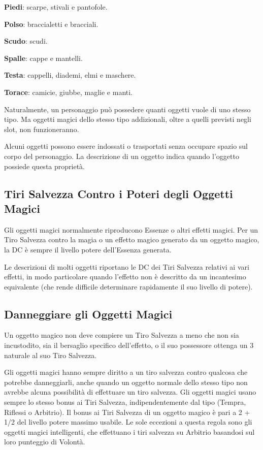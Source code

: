 \documentclass[a4paper,11pt,twoside,openany]{book}
\begin{document}
\textbf{Piedi}: scarpe, stivali e pantofole.

\textbf{Polso}: braccialetti e bracciali.

\textbf{Scudo}: scudi.

\textbf{Spalle}: cappe e mantelli.

\textbf{Testa}: cappelli, diademi, elmi e maschere.

\textbf{Torace}: camicie, giubbe, maglie e manti.

Naturalmente, un personaggio può possedere quanti oggetti vuole di uno stesso tipo. Ma oggetti magici dello stesso tipo addizionali, oltre a quelli previsti negli slot, non funzioneranno.

Alcuni oggetti possono essere indossati o trasportati senza occupare spazio sul corpo del personaggio. La descrizione di un oggetto indica quando l'oggetto possiede questa proprietà.


\subsection{Tiri Salvezza Contro i Poteri degli Oggetti Magici}

\label{tiri-salvezza-contro-i-poteri-degli-oggetti-magici}

Gli oggetti magici normalmente riproducono Essenze o altri effetti magici. Per un Tiro Salvezza contro la magia o un effetto magico generato da un oggetto magico, la DC è sempre il livello potere dell'Essenza generata.

Le descrizioni di molti oggetti riportano le DC dei Tiri Salvezza relativi ai vari effetti, in modo particolare quando l'effetto non è descritto da un incantesimo equivalente (che rende difficile determinare rapidamente il suo livello di potere).


\subsection{Danneggiare gli Oggetti Magici}

\label{danneggiare-gli-oggetti-magici}

Un oggetto magico non deve compiere un Tiro Salvezza a meno che non sia incustodito, sia il bersaglio specifico dell'effetto, o il suo possessore ottenga un 3 naturale al suo Tiro Salvezza.

Gli oggetti magici hanno sempre diritto a un tiro salvezza contro qualcosa che potrebbe danneggiarli, anche quando un oggetto normale dello stesso tipo non avrebbe alcuna possibilità di effettuare un tiro salvezza. Gli oggetti magici usano sempre lo stesso bonus ai Tiri Salvezza, indipendentemente dal tipo (Tempra, Riflessi o Arbitrio). Il bonus ai Tiri Salvezza di un oggetto magico è pari a 2 + 1/2 del livello potere massimo usabile. Le sole eccezioni a questa regola sono gli oggetti magici intelligenti, che effettuano i tiri salvezza su Arbitrio basandosi sul loro punteggio di Volontà.
\end{document}
